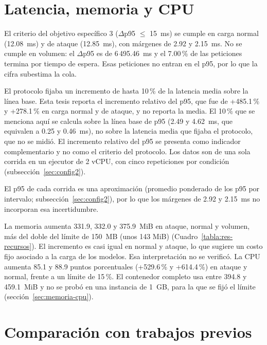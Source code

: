 \section{Latencia, memoria y CPU}

El criterio del objetivo específico 3 ($\Delta$p95 $\leq$ 15~ms) se cumple en carga normal (12.08~ms) y de ataque (12.85~ms), con márgenes de 2.92 y 2.15~ms.
No se cumple en volumen: el $\Delta$p95 es de 6\,495.46~ms y el 7.00\,\% de las peticiones termina por tiempo de espera. Esas peticiones no entran en el p95, por lo que la cifra subestima la cola.

El protocolo fijaba un incremento de hasta 10\,\% de la latencia media sobre la línea base. Esta tesis reporta el incremento relativo del p95, que fue de +485.1\,\% y +278.1\,\% en carga normal y de ataque, y no reporta la media. El 10\,\% que se menciona aquí se calcula sobre la línea base de p95 (2.49 y 4.62~ms, que equivalen a 0.25 y 0.46~ms), no sobre la latencia media que fijaba el protocolo, que no se midió. El incremento relativo del p95 se presenta como indicador complementario y no como el criterio del protocolo.
Los datos son de una sola corrida en un ejecutor de 2 vCPU, con cinco repeticiones por condición (subsección~\ref{sec:config2}).

El p95 de cada corrida es una aproximación (promedio ponderado de los p95 por intervalo; subsección~\ref{sec:config2}), por lo que los márgenes de 2.92 y 2.15~ms no incorporan esa incertidumbre.

La memoria aumenta 331.9, 332.0 y 375.9~MiB en ataque, normal y volumen, más del doble del límite de 150~MB (unos 143 MiB) (Cuadro~\ref{tabla:res-recursos}). El incremento es casi igual en normal y ataque, lo que sugiere un costo fijo asociado a la carga de los modelos. Esa interpretación no se verificó. La CPU aumenta 85.1 y 88.9 puntos porcentuales (+529.6\,\% y +614.4\,\%) en ataque y normal, frente a un límite de 15\,\%. El contenedor completo usa entre 394.8 y 459.1~MiB y no se probó en una instancia de 1~GB, para la que se fijó el límite (sección~\ref{sec:memoria-cpu}).

\section{Comparación con trabajos previos}

